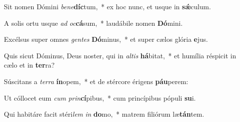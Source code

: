 \item Sit nomen Dómini \textit{be}\textit{ne}\textbf{díc}tum,~* ex hoc nunc, et usque in \textbf{sǽ}culum.
\item A solis ortu usque \textit{ad} \textit{oc}\textbf{cá}sum,~* laudábile nomen \textbf{Dó}mini.
\item Excélsus super omnes \textit{gen}\textit{tes} \textbf{Dó}minus,~* et super cælos glória \textbf{e}jus.
\item Quis sicut Dóminus, Deus noster, qui in \textit{al}\textit{tis} \textbf{há}bitat,~* et humília réspicit in cælo et in \textbf{ter}ra?
\item Súscitans a \textit{ter}\textit{ra} \textbf{ín}opem,~* et de stércore érigens \textbf{páu}perem:
\item Ut cóllocet eum \textit{cum} \textit{prin}\textbf{cí}pibus,~* cum princípibus pópuli \textbf{su}i.
\item Qui habitáre facit stéri\textit{lem} \textit{in} \textbf{do}mo,~* matrem filiórum læ\textbf{tán}tem.
